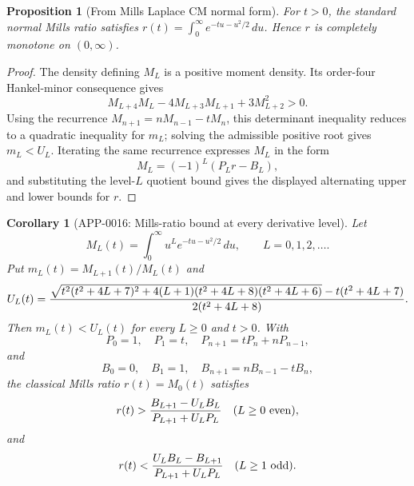 \documentclass[11pt]{article}
\numberwithin{equation}{section}
\newtheorem{proposition}[theorem]{Proposition}
\newtheorem{corollary}[theorem]{Corollary}
\theoremstyle{definition}
\theoremstyle{remark}
\newcommand{\1}{\mathbf 1}
\begin{document}
\begin{proposition}[From Mills Laplace CM normal form]
\label{res:from-mills-laplace-cm-normal-form}
For \(t>0\), the standard normal Mills ratio satisfies \(r(t)=\int_0^\infty e^{-tu-u^2/2}\,du\). Hence \(r\) is completely monotone on \((0,\infty)\).
\end{proposition}

\begin{proof}
The density defining \(M_L\) is a positive moment density.  Its order-four
Hankel-minor consequence gives
\[
M_{L+4}M_L-4M_{L+3}M_{L+1}+3M_{L+2}^2>0.
\]
Using the recurrence \(M_{n+1}=nM_{n-1}-tM_n\), this determinant inequality
reduces to a quadratic inequality for \(m_L\); solving the admissible positive
root gives \(m_L<U_L\).  Iterating the same recurrence expresses \(M_L\) in the
form
\[
M_L=(-1)^L(P_L r-B_L),
\]
and substituting the level-\(L\) quotient bound gives the displayed alternating
upper and lower bounds for \(r\).
\end{proof}

\begin{corollary}[APP-0016: Mills-ratio bound at every derivative level]
\label{thm:app16-mills-all-l}
Let
\[
  M_L(t)=\int_0^\infty u^L e^{-tu-u^2/2}\,du,\qquad L=0,1,2,\ldots .
\]
Put \(m_L(t)=M_{L+1}(t)/M_L(t)\) and
\[
 U_L(t)=
 {\sqrt{t^2(t^2+4L+7)^2+4(L+1)(t^2+4L+8)(t^2+4L+6)}
       -t(t^2+4L+7)
  \over 2(t^2+4L+8)} .
\]
Then \(m_L(t)<U_L(t)\) for every \(L\ge0\) and \(t>0\).  With
\[
P_0=1,\quad P_1=t,\quad P_{n+1}=tP_n+nP_{n-1},
\]
and
\[
B_0=0,\quad B_1=1,\quad B_{n+1}=nB_{n-1}-tB_n,
\]
the classical Mills ratio \(r(t)=M_0(t)\) satisfies
\[
 r(t)>{B_{L+1}-U_LB_L\over P_{L+1}+U_LP_L}\quad(L\ge0\ {\rm even}),
\]
and
\[
 r(t)<{U_LB_L-B_{L+1}\over P_{L+1}+U_LP_L}\quad(L\ge1\ {\rm odd}).
\]


\end{corollary}
\end{document}
